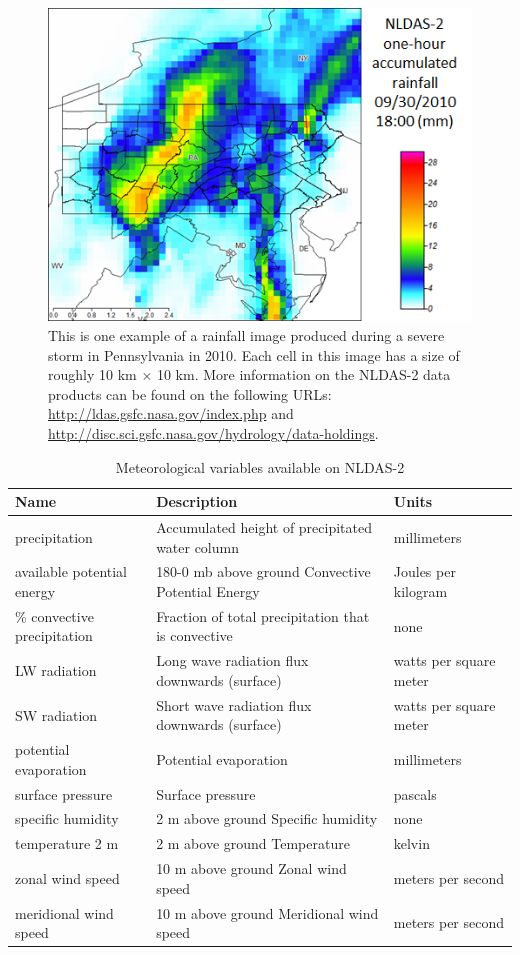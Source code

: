 \documentclass{article}
\begin{document}
\begin{figure}[ht] \vskip 0.2in
\begin{center}
\centerline{\includegraphics[width=0.9\columnwidth]{images/weather.png}}
\caption{This is one example of a rainfall image produced during a severe storm in Pennsylvania in 2010. Each cell in this image has a size of roughly 10 km $\times$ 10 km. More information on the NLDAS-2 data products can be found on the following URLs: \url{http://ldas.gsfc.nasa.gov/index.php} and \url{http://disc.sci.gsfc.nasa.gov/hydrology/data-holdings}.}
\label{fig:example_rainfall}
\end{center}
\vskip -0.2in
\end{figure}

\begin{table}[t]
\caption{Meteorological variables available on NLDAS-2}
\label{tab:variables}
\begin{tabular}{p{4cm} p{8cm} p{3.5cm}}
\hline
\textbf{Name} &\textbf{Description} &\textbf{Units} \\
\hline
precipitation &Accumulated height of precipitated water column &millimeters\\
available potential energy &180-0 mb above ground Convective Potential
Energy &Joules per kilogram \\
\% convective precipitation &Fraction of total precipitation that is convective
&none \\
LW radiation &Long wave radiation flux downwards (surface) &watts per square
meter \\
SW radiation &Short wave radiation flux downwards (surface) &watts per
square meter \\
potential evaporation &Potential evaporation &millimeters \\
surface pressure &Surface pressure &pascals \\
specific humidity &2 m above ground Specific humidity &none \\
temperature 2 m &2 m above ground Temperature &kelvin \\
zonal wind speed &10 m above ground Zonal wind speed &meters per second \\
meridional wind speed &10 m above ground Meridional wind speed &meters per
second \\
\hline
\end{tabular}
\end{table}
\end{document}
